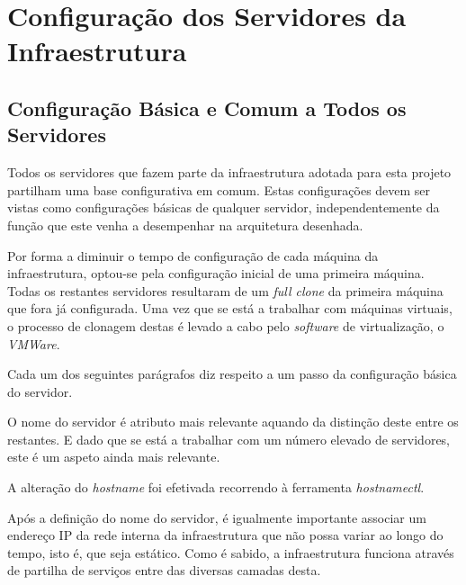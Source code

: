 \section{Configuração dos Servidores da Infraestrutura}

\subsection{Configuração Básica e Comum a Todos os Servidores}

Todos os servidores que fazem parte da infraestrutura adotada para esta projeto partilham uma base configurativa em comum.
Estas configurações devem ser vistas como configurações básicas de qualquer servidor, independentemente da função que este venha a desempenhar na arquitetura desenhada.

Por forma a diminuir o tempo de configuração de cada máquina da infraestrutura, optou-se pela configuração inicial de uma primeira máquina.
Todas os restantes servidores resultaram de um \textit{full clone} da primeira máquina que fora já configurada.
Uma vez que se está a trabalhar com máquinas virtuais, o processo de clonagem destas é levado a cabo pelo \textit{software} de virtualização, o \textit{VMWare}.

Cada um dos seguintes parágrafos diz respeito a um passo da configuração básica do servidor.


O nome do servidor é atributo mais relevante aquando da distinção deste entre os restantes.
E dado que se está a trabalhar com um número elevado de servidores, este é um aspeto ainda mais relevante.

A alteração do \textit{hostname} foi efetivada recorrendo à ferramenta \textit{hostnamectl}.

\begin{figure}[!hbt]
\end{figure}


Após a definição do nome do servidor, é igualmente importante associar um endereço IP da rede interna da infraestrutura que não possa variar ao longo do tempo, isto é, que seja estático.
Como é sabido, a infraestrutura funciona através de partilha de serviços entre das diversas camadas desta.

